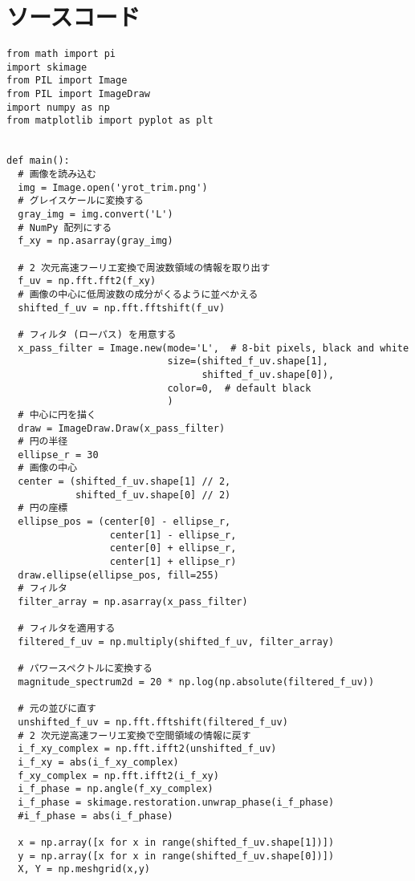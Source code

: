 \appendix
\def\thesection{補遺\Alph{section}}
\renewcommand*{\thelstlisting}{\Alph{section}.\arabic{lstlisting}}
\section{ソースコード}
\begin{lstlisting}[caption=$z$軸回転関連のソースコード,label=src_zrot]
from math import pi
import skimage
from PIL import Image
from PIL import ImageDraw
import numpy as np
from matplotlib import pyplot as plt


def main():
  # 画像を読み込む
  img = Image.open('yrot_trim.png')
  # グレイスケールに変換する
  gray_img = img.convert('L')
  # NumPy 配列にする
  f_xy = np.asarray(gray_img)

  # 2 次元高速フーリエ変換で周波数領域の情報を取り出す
  f_uv = np.fft.fft2(f_xy)
  # 画像の中心に低周波数の成分がくるように並べかえる
  shifted_f_uv = np.fft.fftshift(f_uv)

  # フィルタ (ローパス) を用意する
  x_pass_filter = Image.new(mode='L',  # 8-bit pixels, black and white
                            size=(shifted_f_uv.shape[1],
                                  shifted_f_uv.shape[0]),
                            color=0,  # default black
                            )
  # 中心に円を描く
  draw = ImageDraw.Draw(x_pass_filter)
  # 円の半径
  ellipse_r = 30
  # 画像の中心
  center = (shifted_f_uv.shape[1] // 2,
            shifted_f_uv.shape[0] // 2)
  # 円の座標
  ellipse_pos = (center[0] - ellipse_r,
                  center[1] - ellipse_r,
                  center[0] + ellipse_r,
                  center[1] + ellipse_r)
  draw.ellipse(ellipse_pos, fill=255)
  # フィルタ
  filter_array = np.asarray(x_pass_filter)

  # フィルタを適用する
  filtered_f_uv = np.multiply(shifted_f_uv, filter_array)

  # パワースペクトルに変換する
  magnitude_spectrum2d = 20 * np.log(np.absolute(filtered_f_uv))

  # 元の並びに直す
  unshifted_f_uv = np.fft.fftshift(filtered_f_uv)
  # 2 次元逆高速フーリエ変換で空間領域の情報に戻す
  i_f_xy_complex = np.fft.ifft2(unshifted_f_uv)
  i_f_xy = abs(i_f_xy_complex)
  f_xy_complex = np.fft.ifft2(i_f_xy)
  i_f_phase = np.angle(f_xy_complex)
  i_f_phase = skimage.restoration.unwrap_phase(i_f_phase)
  #i_f_phase = abs(i_f_phase)

  x = np.array([x for x in range(shifted_f_uv.shape[1])])
  y = np.array([x for x in range(shifted_f_uv.shape[0])])
  X, Y = np.meshgrid(x,y)


\end{lstlisting}
